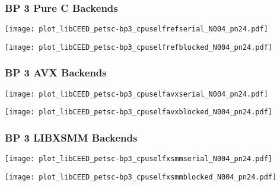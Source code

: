\documentclass{beamer}
\begin{document}

\begin{frame}
\begin{center}
\frametitle{BP 3 Pure C Backends}

\begin{multicols}{2}

\begin{flushleft}
\texttt{[image: plot\_libCEED\_petsc-bp3\_cpuselfrefserial\_N004\_pn24.pdf]}
\end{flushleft}

\begin{flushright}
\texttt{[image: plot\_libCEED\_petsc-bp3\_cpuselfrefblocked\_N004\_pn24.pdf]}
\end{flushright}

\end{multicols}

\end{center}
\end{frame}


\begin{frame}
\begin{center}
\frametitle{BP 3 AVX Backends}

\begin{multicols}{2}

\begin{flushleft}
\texttt{[image: plot\_libCEED\_petsc-bp3\_cpuselfavxserial\_N004\_pn24.pdf]}
\end{flushleft}

\begin{flushright}
\texttt{[image: plot\_libCEED\_petsc-bp3\_cpuselfavxblocked\_N004\_pn24.pdf]}
\end{flushright}

\end{multicols}

\end{center}
\end{frame}


\begin{frame}
\begin{center}
\frametitle{BP 3 LIBXSMM Backends}

\begin{multicols}{2}

\begin{flushleft}
\texttt{[image: plot\_libCEED\_petsc-bp3\_cpuselfxsmmserial\_N004\_pn24.pdf]}
\end{flushleft}

\begin{flushright}
\texttt{[image: plot\_libCEED\_petsc-bp3\_cpuselfxsmmblocked\_N004\_pn24.pdf]}
\end{flushright}

\end{multicols}

\end{center}
\end{frame}


\end{document}
